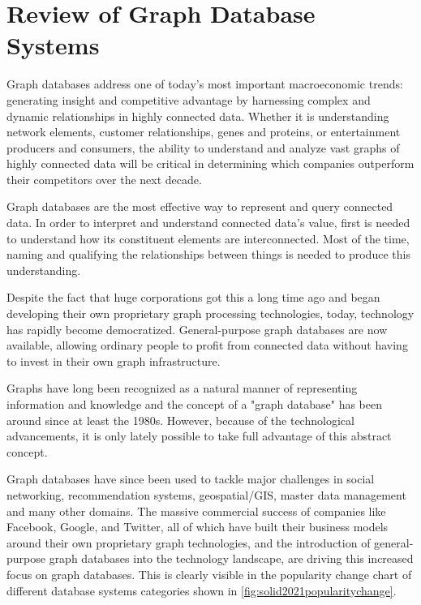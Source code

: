 \section{Review of Graph Database Systems} \label{section:LiteratureReview/ReviewofGraphDatabaseSystems}
Graph databases address one of today's most important macroeconomic trends:
generating insight and competitive advantage by harnessing complex and dynamic relationships in highly connected data.
Whether it is understanding network elements, customer relationships, genes  and proteins, or entertainment producers and consumers, the ability to understand and analyze vast graphs of highly connected data will be critical in determining which companies outperform their competitors over the next decade.

Graph databases are the most effective way to represent and query connected data.
In order to interpret and understand connected data's value, first is needed to understand how its constituent elements are interconnected.
Most of the time, naming and qualifying the relationships between things is needed to produce this understanding.

Despite the fact that huge corporations got this a long time ago and began developing their own proprietary graph processing technologies, today, technology has rapidly become democratized.
General-purpose graph databases are now available, allowing ordinary people to profit from connected data without having to invest in their own graph infrastructure.

Graphs have long been recognized as a natural manner of representing information and knowledge and the concept of a "graph database" has been around since at least the 1980s.
However, because of the technological advancements, it is only lately possible to take full advantage of this abstract concept.
	
Graph databases have since been used to tackle major challenges in social networking, recommendation systems, geospatial/GIS, master data management and many other domains.
The massive commercial success of companies like \gls{Facebook}, \gls{Google}, and \gls{Twitter}, all of which have built their business models around their own proprietary graph technologies, and the introduction of general-purpose graph databases into the technology landscape, are driving this increased focus on graph databases.
This is clearly visible in the popularity change chart of different database systems categories shown in \hyperref[fig:solid2021popularitychange]{\autoref{fig:solid2021popularitychange}}.

